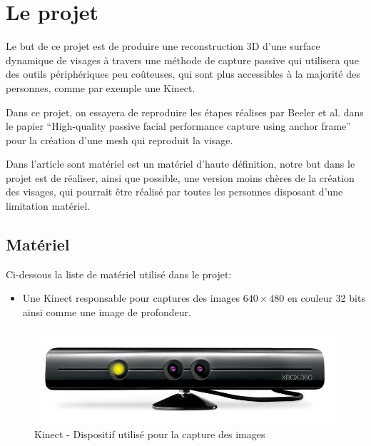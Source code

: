 \documentclass[a4paper,12pt]{article}
\begin{document}
\section{Le projet}

Le but de ce projet est de produire une reconstruction 3D d'une
surface dynamique de visages à travers une méthode de capture passive
qui utilisera que des outils périphériques peu coûteuses, qui sont
plus accessibles à la majorité des personnes, comme par exemple une Kinect.

Dans ce projet, on essayera de reproduire les étapes réalises par
Beeler et al. dans le papier ``High-quality passive facial performance
capture using anchor frame''\cite{Beeler:2011:HPF:2010324.1964970}
pour la création d'une mesh qui reproduit la visage. 

Dans l'article sont matériel est un matériel d'haute définition, notre
but dans le projet est de réaliser, ainsi que possible, une version
moins chères de la création des visages, qui pourrait être réalisé par
toutes les personnes disposant d'une limitation matériel. 

\subsection{Matériel}

Ci-dessous la liste de matériel utilisé dans le projet: 

\begin{itemize}
\item Une Kinect responsable pour captures des images $640 \times 480$ en
  couleur 32 bits ainsi comme une image de profondeur.  
\end{itemize}

\begin{figure}[h!]
  \begin{center}
    \includegraphics[scale=0.2]{img/kinect.jpg}
    \caption{Kinect - Dispositif utilisé pour la capture des images}
  \end{center}
\end{figure}
\end{document}
